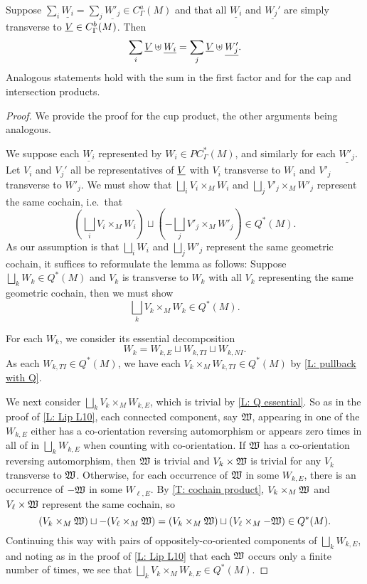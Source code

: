 \begin{proposition}\label{P: multicup}
Suppose $\sum_i \underline{W_i} = \sum_j \underline{W'_j} \in C_\Gamma^a(M)$ and that all $\underline{W_i}$ and $\underline{W_j'}$ are simply transverse to $\underline{V} \in C_\Gamma^b(M)$. Then $$\sum_i \underline{V} \uplus \underline{W_i} = \sum_j \underline{V}\uplus \underline{W'_j}.$$
Analogous statements hold with the sum in the first factor and for the cap and intersection products.
\end{proposition}
\begin{proof}
We provide the proof for the cup product, the other arguments being analogous.

We suppose each $\underline{W_i}$ represented by $W_i \in PC^*_\Gamma(M)$, and similarly for each $\underline{W'_j}$. Let $V_i$ and $V_j'$ all be representatives of $\underline{V}$ with $V_i$ transverse to $W_i$ and $V'_j$ transverse to $W'_j$. We must show that $\bigsqcup_i V_i \times_M W_i$ and $\bigsqcup_j V'_j \times_M W'_j$ represent the same cochain, i.e.\ that $$\left(\bigsqcup_i V_i \times_M W_i\right) \sqcup \left(-\bigsqcup_j V'_j \times_M W'_j\right) \in Q^*(M).$$
As our assumption is that $\bigsqcup_i W_i$ and $\bigsqcup_j W'_j$ represent the same geometric cochain, it suffices to reformulate the lemma as follows: Suppose $\bigsqcup_k W_k \in Q^*(M)$ and $V_k$ is transverse to $W_k$ with all $V_k$ representing the same geometric cochain, then we must show
 $$\bigsqcup_k V_k \times_M W_k \in Q^*(M).$$

For each $W_k$, we consider its essential decomposition $$W_k = W_{k,E}\sqcup W_{k,TI}\sqcup W_{k,NI}.$$
As each $W_{k,TI} \in Q^*(M)$, we have each $V_k \times_M W_{k,TI} \in Q^*(M)$ by \cref{L: pullback with Q}.

We next consider $\bigsqcup_k V_k \times_M W_{k,E}$, which is trivial by \cref{L: Q essential}. So as in the proof of \cref{L: Lip L10}, each connected component, say $\mathfrak W$, appearing in one of the $W_{k,E}$ either has a co-orientation reversing automorphism or appears zero times in all of in $\bigsqcup_k W_{k,E}$ when counting with co-orientation. If $\mathfrak W$ has a co-orientation reversing automorphism, then $\mathfrak W$ is trivial and $V_k \times \mathfrak W$ is trivial for any $V_k$ transverse to $\mathfrak W$. Otherwise, for each occurrence of $\mathfrak W$ in some $W_{k,E}$, there is an occurrence of $-\mathfrak W$ in some $W_{\ell,E}$. By \cref{T: cochain product}, $V_k \times_M \mathfrak W$ and $V_\ell \times \mathfrak W$ represent the same cochain, so
$$(V_k \times_M \mathfrak W)\sqcup -(V_\ell \times_M \mathfrak W) = (V_k \times_M \mathfrak W)\sqcup(V_\ell \times_M -\mathfrak W) \in Q^*(M).$$
Continuing this way with pairs of oppositely-co-oriented components of $\bigsqcup_k W_{k,E}$, and noting as in the proof of \cref{L: Lip L10} that each $\mathfrak W$ occurs only a finite number of times, we see that $\bigsqcup_k V_k \times_M W_{k,E} \in Q^*(M)$.


\end{proof}
